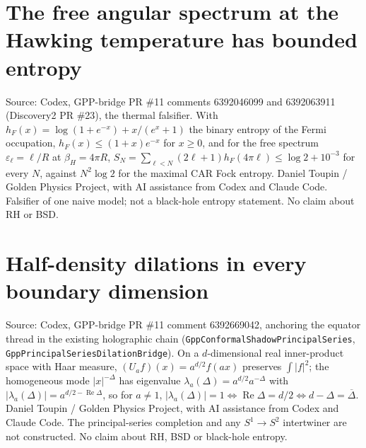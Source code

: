 \documentclass{report}
\theoremstyle{definition}
\begin{document}
\begin{itemize}
\begin{itemize}
\section{The free angular spectrum at the Hawking temperature has bounded entropy}
Source: Codex, GPP-bridge PR \#11 comments 6392046099 and 6392063911 (Discovery2 PR \#23), the thermal falsifier. With $h_F(x)=\log(1+e^{-x})+x/(e^x+1)$ the binary entropy of
the Fermi occupation, $h_F(x)\le(1+x)e^{-x}$ for $x\ge0$, and for the free spectrum $\varepsilon_\ell=\ell/R$ at $\beta_H=4\pi R$,
$S_N=\sum_{\ell<N}(2\ell+1)h_F(4\pi\ell)\le\log2+10^{-3}$ for every $N$, against $N^2\log2$ for the maximal CAR Fock entropy. Daniel Toupin / Golden Physics Project, with AI
assistance from Codex and Claude Code. Falsifier of one naive model; not a black-hole entropy statement. No claim about RH or BSD.

\section{Half-density dilations in every boundary dimension}
Source: Codex, GPP-bridge PR \#11 comment 6392669042, anchoring the equator thread in the existing holographic chain (\texttt{GppConformalShadowPrincipalSeries},
\texttt{GppPrincipalSeriesDilationBridge}). On a $d$-dimensional real inner-product space with Haar measure, $(U_af)(x)=a^{d/2}f(ax)$ preserves $\int|f|^2$; the
homogeneous mode $|x|^{-\Delta}$ has eigenvalue $\lambda_a(\Delta)=a^{d/2}a^{-\Delta}$ with $|\lambda_a(\Delta)|=a^{d/2-\operatorname{Re}\Delta}$, so for $a\ne1$,
$|\lambda_a(\Delta)|=1\iff\operatorname{Re}\Delta=d/2\iff d-\Delta=\overline\Delta$. Daniel Toupin / Golden Physics Project, with AI assistance from Codex and Claude Code.
The principal-series completion and any $S^1\to S^2$ intertwiner are not constructed. No claim about RH, BSD or black-hole entropy.


\end{itemize}
\end{itemize}
\end{document}
